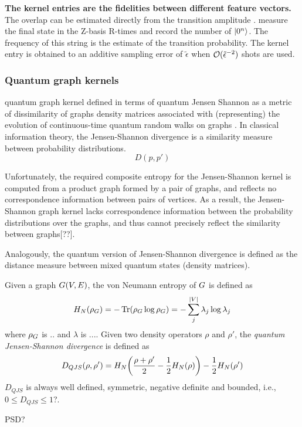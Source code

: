 \textbf{The kernel entries are the fidelities between different feature vectors.}
The overlap can be estimated directly from the transition amplitude 
.
measure the final state in the Z-basis R-times and record the number of $\ket{0^n}$.
The frequency of this string is the estimate of the transition probability.
The kernel entry is obtained to an additive sampling error of $\tilde{\epsilon}$ when $\mathcal{O}(\tilde{\epsilon}^{-2})$ shots are used.


\subsubsection{Quantum graph kernels}
quantum graph kernel defined in terms of quantum Jensen Shannon as a metric of dissimilarity of graphs
density matrices associated with (representing) the evolution of continuous-time quantum random walks on graphs
\cite{baiQuantumJensenShannon2015}.
In classical information theory, the Jensen-Shannon divergence is a similarity measure between probability distributions.
\begin{equation}
	D(p,p')
\end{equation}
\begin{remark}
	Unfortunately, the required composite entropy for the Jensen-Shannon kernel is computed from a product graph formed by a pair of graphs,
	and reflects no correspondence information between pairs of vertices.
	As a result, the Jensen-Shannon graph kernel lacks correspondence information between the probability distributions over the graphs,
	and thus cannot precisely reflect the similarity between graphs[??].
\end{remark}
Analogously, the quantum version of Jensen-Shannon divergence is defined as the distance measure between mixed quantum states (density matrices).
\begin{definition}[]
	Given a graph $G(V,E)$, the von Neumann entropy of $G$ is defined as
	\begin{equation}
		H_N (\rho_{G}) = -\Tr(\rho_{G}\log \rho_{G})
		= - \sum_{j}^{\abs{V}} \lambda_j \log \lambda_j
	\end{equation}
	where $\rho_{G}$ is .. and $\lambda$ is ....
	Given two density operators $\rho$ and $\rho'$,
	the \emph{quantum Jensen-Shannon divergence} is defined as
	\begin{equation}
		D_{QJS} (\rho,\rho') = 
		H_N\qty(\frac{\rho+\rho'}{2}- \frac{1}{2}H_N(\rho)) - \frac{1}{2} H_N (\rho')
	\end{equation}
	$D_{QJS}$ is always well defined, symmetric, negative definite and bounded, i.e., $0\le D_{QJS}\le 1$?.
\end{definition}
PSD?

